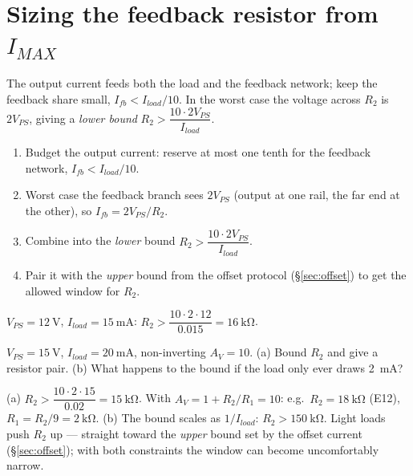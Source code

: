 \documentclass[11pt,a4paper,oneside]{book}
\begin{document}
\section{Sizing the feedback resistor from $I_{MAX}$}
The output current feeds both the load and the feedback network; keep the
feedback share small, $I_{fb}<I_{load}/10$. In the worst case the voltage across
$R_2$ is $2V_{PS}$, giving a \emph{lower bound}
$R_2>\dfrac{10\cdot 2V_{PS}}{I_{load}}$.

\begin{protocol}
\begin{enumerate}[leftmargin=1.5cm]
  \item Budget the output current: reserve at most one tenth for the feedback
        network, $I_{fb}<I_{load}/10$.
  \item Worst case the feedback branch sees $2V_{PS}$ (output at one rail, the
        far end at the other), so $I_{fb}=2V_{PS}/R_2$.
  \item Combine into the \emph{lower} bound $R_2>\dfrac{10\cdot2V_{PS}}{I_{load}}$.
  \item Pair it with the \emph{upper} bound from the offset protocol
        (\S\ref{sec:offset}) to get the allowed window for $R_2$.
\end{enumerate}
\end{protocol}

\begin{wexample}
$V_{PS}=\qty{12}{\volt}$, $I_{load}=\qty{15}{\milli\ampere}$:
$R_2>\dfrac{10\cdot2\cdot12}{0.015}=\qty{16}{\kilo\ohm}$.
\end{wexample}

\begin{exercise}
$V_{PS}=\qty{15}{\volt}$, $I_{load}=\qty{20}{\milli\ampere}$, non-inverting
$A_V=10$. (a) Bound $R_2$ and give a resistor pair. (b) What happens to the
bound if the load only ever draws \qty{2}{\milli\ampere}?
\end{exercise}
\begin{solution}
(a) $R_2>\dfrac{10\cdot2\cdot15}{0.02}=\qty{15}{\kilo\ohm}$. With
$A_V=1+R_2/R_1=10$: e.g.\ $R_2=\qty{18}{\kilo\ohm}$ (E12),
$R_1=R_2/9=\qty{2}{\kilo\ohm}$. (b) The bound scales as $1/I_{load}$:
$R_2>\qty{150}{\kilo\ohm}$. Light loads push $R_2$ up --- straight toward the
\emph{upper} bound set by the offset current (\S\ref{sec:offset}); with both
constraints the window can become uncomfortably narrow.
\end{solution}
\end{document}
